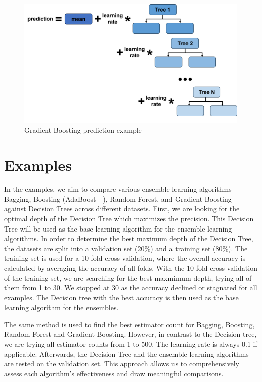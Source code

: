 \begin{figure}[htbp]
    \centering
    \includegraphics[width=.8\textwidth]{figures/gradient_boosting_prediction}
    \caption{Gradient Boosting prediction example}
\end{figure}



\section{Examples}
In the examples, we aim to compare various ensemble learning algorithms - Bagging, 
Boosting (AdaBoost - \citet{freund1996experiments}), Random Forest, and Gradient 
Boosting - against Decision Trees across different datasets.
First, we are looking for the optimal depth of the Decision Tree which maximizes the 
precision. This Decision Tree will be used as the base learning algorithm for 
the ensemble learning algorithms.
In order to determine the best maximum depth of the Decision Tree, the datasets are 
split into a validation set (20\%) and a training set (80\%). The training set is used
for a 10-fold cross-validation, where the overall accuracy is calculated by averaging the 
accuracy of all folds. With the 10-fold cross-validation of the training set, we are
searching for the best maxmimum depth, trying all of them from 1 to 30. We stopped at
30 as the accuracy declined or stagnated for all examples. The Decision tree with the
best accuracy is then used as the base learning algorithm for the ensembles.


The same method is used to find the best estimator count for Bagging, Boosting, 
Random Forest and Gradient Boosting. However, in contrast to the Decision tree,
we are trying all estimator counts from 1 to 500.
The learning rate is always 0.1 if applicable. Afterwards, the Decision Tree and
the ensemble learning algorithms are tested on the validation set.
This approach allows us to comprehensively assess each algorithm's effectiveness
and draw meaningful comparisons.


